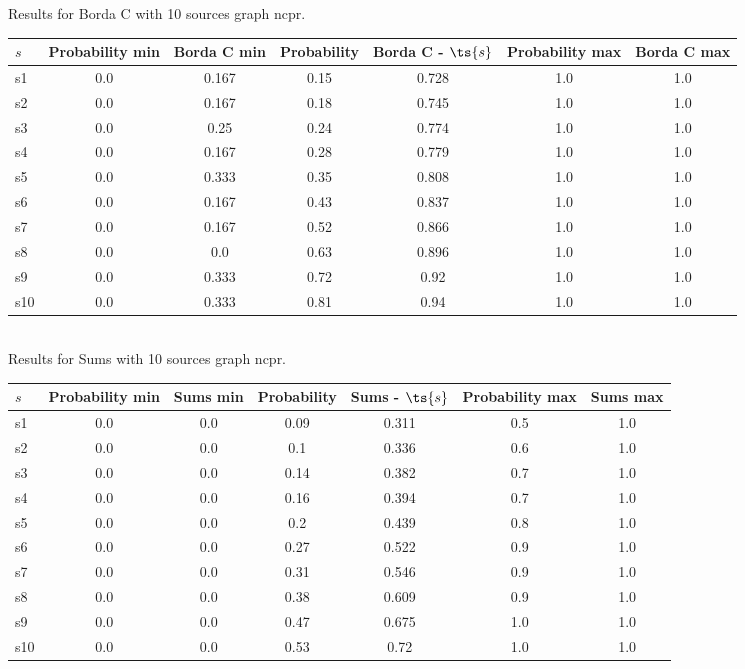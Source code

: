 \documentclass{article}
\begin{document}
\noindent Results for Borda C with 10 sources graph ncpr.

\noindent\begin{tabular}{|l|c|c|c|c|c|c|}
\hline
$s$& Probability min & Borda C min & Probability & Borda C - $\ts{s}$ & Probability max & Borda C max\\
\hline
s1 &0.0 & 0.167 & 0.15 & 0.728 & 1.0 & 1.0\\
\hline
s2 &0.0 & 0.167 & 0.18 & 0.745 & 1.0 & 1.0\\
\hline
s3 &0.0 & 0.25 & 0.24 & 0.774 & 1.0 & 1.0\\
\hline
s4 &0.0 & 0.167 & 0.28 & 0.779 & 1.0 & 1.0\\
\hline
s5 &0.0 & 0.333 & 0.35 & 0.808 & 1.0 & 1.0\\
\hline
s6 &0.0 & 0.167 & 0.43 & 0.837 & 1.0 & 1.0\\
\hline
s7 &0.0 & 0.167 & 0.52 & 0.866 & 1.0 & 1.0\\
\hline
s8 &0.0 & 0.0 & 0.63 & 0.896 & 1.0 & 1.0\\
\hline
s9 &0.0 & 0.333 & 0.72 & 0.92 & 1.0 & 1.0\\
\hline
s10 &0.0 & 0.333 & 0.81 & 0.94 & 1.0 & 1.0\\
\hline
\end{tabular}\\

\noindent Results for Sums with 10 sources graph ncpr.

\noindent\begin{tabular}{|l|c|c|c|c|c|c|}
\hline
$s$& Probability min & Sums min & Probability & Sums - $\ts{s}$ & Probability max & Sums max\\
\hline
s1 &0.0 & 0.0 & 0.09 & 0.311 & 0.5 & 1.0\\
\hline
s2 &0.0 & 0.0 & 0.1 & 0.336 & 0.6 & 1.0\\
\hline
s3 &0.0 & 0.0 & 0.14 & 0.382 & 0.7 & 1.0\\
\hline
s4 &0.0 & 0.0 & 0.16 & 0.394 & 0.7 & 1.0\\
\hline
s5 &0.0 & 0.0 & 0.2 & 0.439 & 0.8 & 1.0\\
\hline
s6 &0.0 & 0.0 & 0.27 & 0.522 & 0.9 & 1.0\\
\hline
s7 &0.0 & 0.0 & 0.31 & 0.546 & 0.9 & 1.0\\
\hline
s8 &0.0 & 0.0 & 0.38 & 0.609 & 0.9 & 1.0\\
\hline
s9 &0.0 & 0.0 & 0.47 & 0.675 & 1.0 & 1.0\\
\hline
s10 &0.0 & 0.0 & 0.53 & 0.72 & 1.0 & 1.0\\
\hline
\end{tabular}\\
\end{document}
